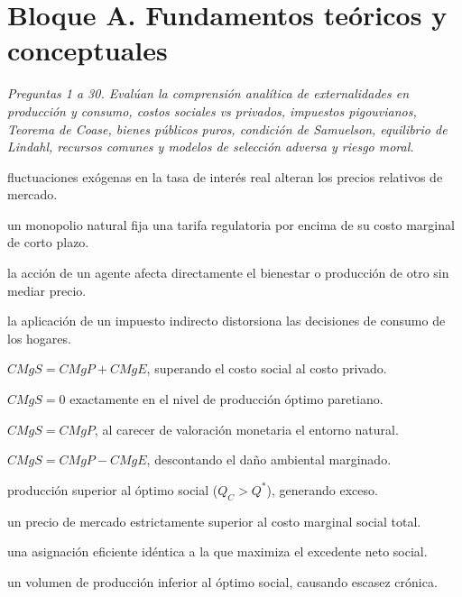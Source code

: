 \section*{Bloque A. Fundamentos teóricos y conceptuales}

\noindent\textit{Preguntas 1 a 30. Evalúan la comprensión analítica de externalidades en producción y consumo, costos sociales vs privados, impuestos pigouvianos, Teorema de Coase, bienes públicos puros, condición de Samuelson, equilibrio de Lindahl, recursos comunes y modelos de selección adversa y riesgo moral.}

\begin{opts}
    \item fluctuaciones exógenas en la tasa de interés real alteran los precios relativos de mercado.
    \item un monopolio natural fija una tarifa regulatoria por encima de su costo marginal de corto plazo.
    \item la acción de un agente afecta directamente el bienestar o producción de otro sin mediar precio.
    \item la aplicación de un impuesto indirecto distorsiona las decisiones de consumo de los hogares.
\end{opts}

\begin{opts}
    \item $CMgS = CMgP + CMgE$, superando el costo social al costo privado.
    \item $CMgS = 0$ exactamente en el nivel de producción óptimo paretiano.
    \item $CMgS = CMgP$, al carecer de valoración monetaria el entorno natural.
    \item $CMgS = CMgP - CMgE$, descontando el daño ambiental marginado.
\end{opts}

\begin{opts}
    \item producción superior al óptimo social ($Q_C > Q^*$), generando exceso.
    \item un precio de mercado estrictamente superior al costo marginal social total.
    \item una asignación eficiente idéntica a la que maximiza el excedente neto social.
    \item un volumen de producción inferior al óptimo social, causando escasez crónica.
\end{opts}

